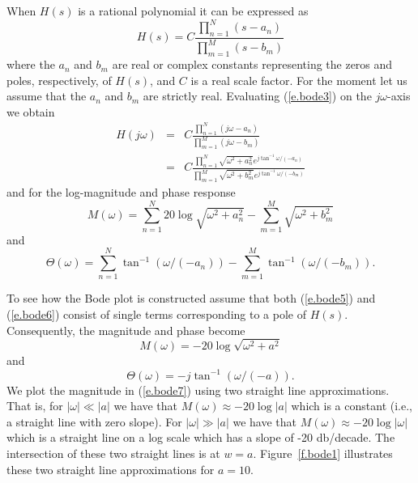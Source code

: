 	When $H(s)$ is a rational polynomial
it can be expressed as
%
\begin{equation}
H(s)=C\frac{\prod_{n=1}^{N}(s-a_n)}{\prod_{m=1}^{M}(s-b_m)}
\label{e.bode3}
\end{equation}
%
where the $a_n$ and $b_m$ are real or complex constants
representing the zeros and poles, respectively, of $H(s)$,
and $C$ is a real scale factor.
For the moment let us assume that the $a_n$ and $b_m$ are
strictly real.  Evaluating (\ref{e.bode3}) on the $j\omega$-axis
we obtain
%
\begin{eqnarray}
H(j\omega)&=&C\frac{\prod_{n=1}^{N}(j\omega-a_n)}{\prod_{m=1}^{M}(j\omega-b_m)}\nonumber\\
&=&C\frac{\prod_{n=1}^{N}\sqrt{\omega^2+a_n^2}e^{j\tan^{-1}\omega/(-a_n)}}{\prod_{m=1}^{M}\sqrt{\omega^2+b_m^2}e^{j\tan^{-1}\omega/(-b_m)}}
\label{e.bode4}
\end{eqnarray}
%
and for the log-magnitude and phase response 
%
\begin{equation}
M(\omega)=\sum_{n=1}^{N}20\log\sqrt{\omega^2+a_n^2}-\sum_{m=1}^M\sqrt{\omega^2+b_m^2}
\label{e.bode5}
\end{equation}
%
and
%
\begin{equation}
\Theta(\omega)=\sum_{n=1}^{N}\tan^{-1}(\omega/(-a_n))-\sum_{m=1}^M\tan^{-1}(\omega/(-b_m)).
\label{e.bode6}
\end{equation}
%

	To see how the Bode plot is
constructed assume that both (\ref{e.bode5}) and (\ref{e.bode6}) consist
of single terms corresponding to a pole of $H(s)$.  Consequently, the 
magnitude and phase become
%
\begin{equation}
M(\omega)=-20\log\sqrt{\omega^2+a^2}
\label{e.bode7}
\end{equation}
%
and
%
\begin{equation}
\Theta(\omega)=-j\tan^{-1}(\omega/(-a)).
\label{e.bode8}
\end{equation}
%
We plot the magnitude in (\ref{e.bode7}) using two straight line
approximations.  That is, for $|\omega|\ll|a|$ we have that $M(\omega)\approx
-20\log|a|$ which is a constant (i.e., a straight line with zero slope).
For $|\omega|\gg|a|$ we have that $M(\omega)\approx-20\log|\omega|$ which
is a straight line on a log scale which has a slope of -20 db/decade.
The intersection of these two straight lines is  at $w=a$.  
Figure~\ref{f.bode1} illustrates these two straight line approximations
for $a=10$.
%

%

